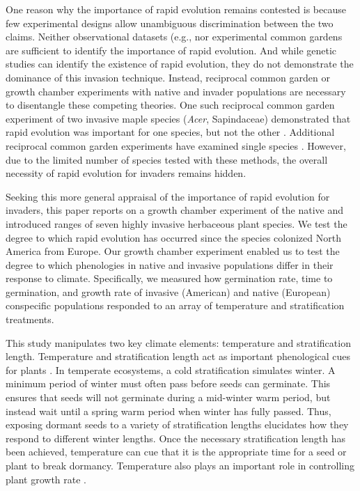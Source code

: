 \documentclass[12pt]{article}\usepackage[]{graphicx}\usepackage[]{color}
\begin{document}
	One reason why the importance of rapid evolution remains contested is because few experimental designs allow unambiguous discrimination between the two claims. Neither observational datasets (e.g., \parencite{Wolkovich2013} nor experimental common gardens \parencite{Conner2004,Vitasse2009} are sufficient to identify the importance of rapid evolution. And while genetic studies can identify the existence of rapid evolution, they do not demonstrate the dominance of this invasion technique. Instead, reciprocal common garden or  growth chamber experiments with native and invader populations are necessary to disentangle these competing theories. One such reciprocal common garden experiment of two invasive maple species (\textit{Acer}, Sapindaceae) demonstrated that rapid evolution was important for one species, but not the other \parencite{Lamarque2015}. Additional reciprocal common garden experiments have examined single species \parencite[e.g.,][]{Williams2008}. However, due to the limited number of species tested with these methods, the overall necessity of rapid evolution for invaders remains hidden.
	
	Seeking this more general appraisal of the importance of rapid evolution for invaders, this paper reports on a growth chamber experiment of the native and introduced ranges of seven highly invasive herbaceous plant species. We test the degree to which rapid evolution has occurred since the species colonized North America from Europe.  Our growth chamber experiment enabled us to test the degree to which phenologies in native and invasive populations differ in their response to climate.   Specifically, we measured how germination rate, time to germination, and growth rate of invasive (American) and native (European) conspecific populations responded to an array of temperature and stratification treatments.
	
	This study manipulates two key climate elements: temperature and stratification length. Temperature and stratification length act as important phenological cues for plants \parencite{Finch2006}. In temperate ecosystems, a cold stratification simulates winter. A minimum period of winter must often pass before seeds can germinate. This ensures that seeds will not germinate during a mid-winter warm period, but instead wait until a spring warm period when winter has fully passed. Thus, exposing dormant seeds to a variety of stratification lengths elucidates how they respond to different winter lengths. Once the necessary stratification length has been achieved, temperature can cue that it is the appropriate time for a seed or plant to break dormancy. Temperature also plays an important role in controlling plant growth rate \parencite{Egli1980,Guilioni2003}.
	
\end{document}
